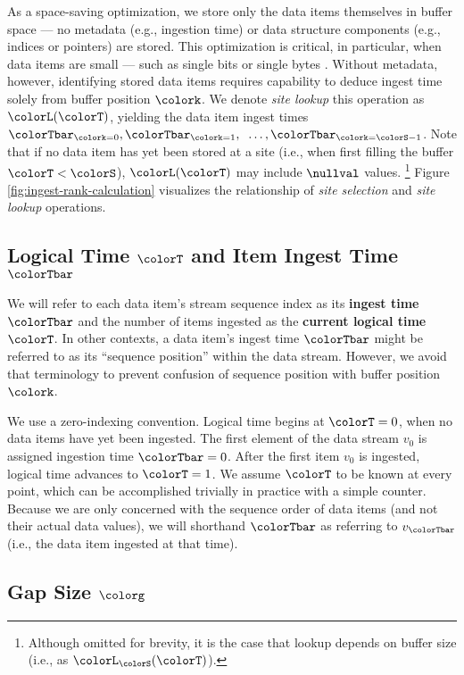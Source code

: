 As a space-saving optimization, we store only the data items themselves in buffer space --- no metadata (e.g., ingestion time) or data structure components (e.g., indices or pointers) are stored.
This optimization is critical, in particular, when data items are small --- such as single bits or single bytes \citep{moreno2022hereditary}.
Without metadata, however, identifying stored data items requires capability to deduce ingest time solely from buffer position $\colork$.
We denote \textit{site lookup} this operation as $\colorL(\colorT)$, yielding the data item ingest times $\colorTbar_{\colork=0}, \colorTbar_{\colork=1}, \;\;\ldots, \colorTbar_{\colork=\colorS-1}$.
Note that if no data item has yet been stored at a site (i.e., when first filling the buffer $\colorT < \colorS$), $\colorL(\colorT)$ may include $\nullval$ values.%
\footnote{%
Although omitted for brevity, it is the case that lookup depends on buffer size (i.e., as $\colorL_{\colorS}(\colorT)$).
}
Figure \ref{fig:ingest-rank-calculation} visualizes the relationship of \textit{site selection} and \textit{site lookup} operations.

\subsection{Logical Time $\colorT$ and Item Ingest Time $\colorTbar$}
\label{sec:notation-time}

We will refer to each data item's stream sequence index as its \textbf{ingest time} $\colorTbar$ and the number of items ingested as the \textbf{current logical time} $\colorT$.
In other contexts, a data item's ingest time $\colorTbar$ might be referred to as its ``sequence position'' within the data stream.
However, we avoid that terminology to prevent confusion of sequence position with buffer position $\colork$.

We use a zero-indexing convention.
Logical time begins at $\colorT=0$, when no data items have yet been ingested.
The first element of the data stream $v_0$ is assigned ingestion time $\colorTbar=0$.
After the first item $v_0$ is ingested, logical time advances to $\colorT=1$.
We assume $\colorT$ to be known at every point, which can be accomplished trivially in practice with a simple counter.
Because we are only concerned with the sequence order of data items (and not their actual data values), we will shorthand $\colorTbar$ as referring to $v_{\colorTbar}$ (i.e., the data item ingested at that time).

\subsection{Gap Size $\colorg$}
\label{sec:notation-gapsize}

